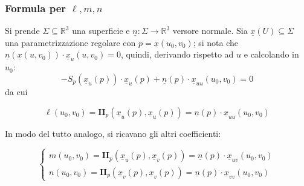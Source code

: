 \documentclass[12pt]{scrartcl}
\theoremstyle{style}
\newenvironment{boxenv}[1][]{
    \begin{eqbox}[#1]
    }{
   \end{eqbox}
}
\numberwithin{equation}{subsection}
\begin{document}
\subsubsection{Formula per $\ell ,m,n$}
Si prende $\Sigma \subseteq \mathbb{R}^3$ una superficie e $\underline{n}: \Sigma \to \mathbb{R}^3$ versore normale.
Sia $\underline{x}(U) \subseteq \Sigma$ una parametrizzazione regolare con $p = \underline{x}(u_0,v_0)$; si nota che $\underline{n}(\underline{x}(u,v_0)) \cdot \underline{x}_u(u,v_0) = 0 $, quindi, derivando rispetto ad $u$ e calcolando in $u_0$:
\[
-S_p (\underline{x}_u (p)) \cdot \underline{x}_u (p) + \underline{n}(p) \cdot \underline{x}_{uu} (u_0,v_0) = 0 
\] 
da cui
\begin{boxenv}[]
\begin{equation}
	\ell (u_0,v_0) = \mathbf{I I} _p (\underline{x}_u(p), \underline{x}_u(p)) = \underline{n}(p) \cdot \underline{x}_{u u } (u_0,v_0)
\end{equation}
\end{boxenv}
\noindent In modo del tutto analogo, si ricavano gli altri coefficienti:
\begin{boxenv}[]
\begin{equation}
	\begin{cases}
		m(u_0,v_0) = \mathbf{II} _p (\underline{x}_u(p),\underline{x}_v(p)) = \underline{n}(p) \cdot \underline{x}_{uv} (u_0,v_0)\\
		n (u_0,v_0) = \mathbf{I I} _p (\underline{x}_v(p),\underline{x}_v(p)) = \underline{n}(p) \cdot \underline{x}_{v v } (u_0,v_0)
	\end{cases}
\end{equation}
\end{boxenv}
\end{document}

